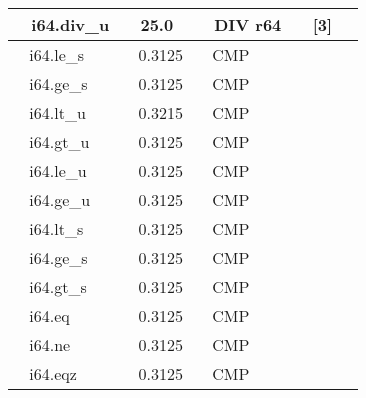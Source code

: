 \documentclass{article}
\begin{document}
\begin{table}
\begin{tabular}{|l|l|l|l|}
\hline
~ i64.div\_u                                & ~ 25.0                       & ~ DIV r64                                            & ~ [3]~~               \\
\hline
~ i64.le\_s                                 & ~ 0.3125                     & ~ CMP                                                &                       \\
\hline
~ i64.ge\_s                                 & ~ 0.3125                     & ~ CMP                                                &                       \\
\hline
~ i64.lt\_u                                 & ~ 0.3215                     & ~ CMP                                                &                       \\
\hline
~ i64.gt\_u                                 & ~ 0.3125                     & ~ CMP                                                &                       \\
\hline
~ i64.le\_u                                 & ~ 0.3125                     & ~ CMP                                                &                       \\
\hline
~ i64.ge\_u                                 & ~ 0.3125                     & ~ CMP                                                &                       \\
\hline
~ i64.lt\_s                                 & ~ 0.3125                     & ~ CMP                                                &                       \\
\hline
~ i64.ge\_s                                 & ~ 0.3125                     & ~ CMP                                                &                       \\
\hline
~ i64.gt\_s                                 & ~ 0.3125                     & ~ CMP                                                &                       \\
\hline
~ i64.eq                                    & ~ 0.3125                     & ~ CMP                                                &                       \\
\hline
~ i64.ne                                    & ~ 0.3125                     & ~ CMP                                                &                       \\
\hline
~ i64.eqz                                   & ~ 0.3125                     & ~ CMP                                                &                       \\

\end{tabular}
\end{table}
\end{document}
